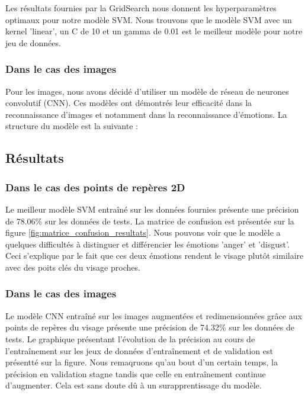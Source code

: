 \documentclass{rapport}
\begin{document}
Les résultats fournies par la GridSearch nous donnent les hyperparamètres optimaux pour notre modèle SVM. Nous trouvons
que le modèle SVM avec un kernel 'linear', un C de 10 et un gamma de 0.01 est le meilleur modèle pour notre jeu de données.\\

\subsubsection{Dans le cas des images}
Pour les images, nous avons décidé d'utiliser un modèle de réseau de neurones convolutif (CNN). Ces modèles ont démontrés
leur efficacité dans la reconnaissance d'images et notamment dans la reconnaissance d'émotions. La structure du modèle est la suivante :\\

\subsection{Résultats}

\subsubsection{Dans le cas des points de repères 2D}

Le meilleur modèle SVM entraîné sur les données fournies présente une précision de 78.06\% sur les données de tests. La matrice de confusion est présentée
sur la figure \ref*{fig:matrice_confusion_resultats}. Nous pouvons voir que le modèle a quelques difficultés à distinguer
et différencier les émotions 'anger' et 'disgust'. Ceci s'explique par le fait que ces deux émotions rendent le visage plutôt similaire avec
des poits clés du visage proches.\\



\subsubsection{Dans le cas des images}
Le modèle CNN entraîné sur les images augmentées et redimensionnées grâce aux points de repères du visage présente une précision
de 74.32\% sur les données de tests. Le graphique présentant l'évolution de la précision au cours de l'entraînement
sur les jeux de données d'entraînement et de validation est présentté sur la figure. Nous remaqruons qu'au bout d'un certain temps, la précision
en validation stagne tandis que celle en entraînement continue d'augmenter. Cela est sans doute dû à un surapprentissage du modèle.
\end{document}
